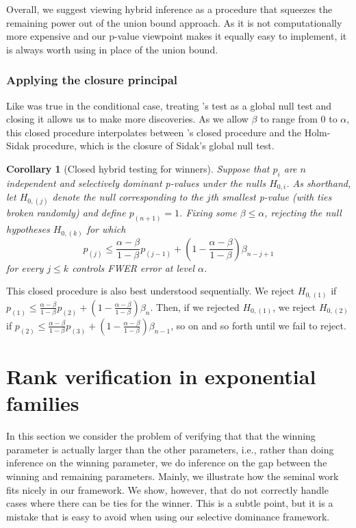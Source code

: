 \documentclass{article}
\newtheorem{corollary}{Corollary}
\begin{document}
Overall, we suggest viewing hybrid inference as a procedure that squeezes the remaining power out of the union bound approach. As it is not computationally more expensive and our p-value viewpoint makes it equally easy to implement, it is always worth using in place of the union bound. 

\subsubsection{Applying the closure principal}

Like was true in the conditional case, treating 's test as a global null test and closing it allows us to make more discoveries. As we allow $\beta$ to range from $0$ to $\alpha$, this closed procedure interpolates between 's closed procedure and the Holm-Sidak procedure, which is the closure of Sidak's global null test. 

\begin{corollary}[Closed hybrid testing for winners]
    \label{cor:hyb_closed}
    Suppose that $p_i$ are $n$ independent and selectively dominant p-values under the nulls $H_{0, i}$. As shorthand, let $H_{0, (j)}$ denote the null corresponding to the $j$th smallest p-value (with ties broken randomly) and define $p_{(n+1)} = 1$. Fixing some $\beta \leq \alpha$, rejecting the null hypotheses $H_{0, (k)}$ for which
    \begin{equation*}
        p_{(j)} \leq \frac{\alpha - \beta}{1-\beta} p_{(j-1)} + \left(1 - \frac{\alpha - \beta}{1-\beta} \right) \beta_{n - j + 1}   
    \end{equation*}
    for every $j \leq k$ controls FWER error at level $\alpha$. 
\end{corollary}

This closed procedure is also best understood sequentially. We reject $H_{0, (1)}$ if $p_{(1)} \leq \frac{\alpha - \beta}{1-\beta} p_{(2)} + (1 - \frac{\alpha - \beta}{1-\beta}) \beta_n$. Then, if we rejected $H_{0, (1)}$, we reject $H_{0, (2)}$ if $p_{(2)} \leq  \frac{\alpha - \beta}{1-\beta} p_{(3)} + (1 - \frac{\alpha -\beta }{1-\beta}) \beta_{n-1}$, so on and so forth until we fail to reject. 


\section{Rank verification in exponential families}
\label{sec:rank_verification}

In this section we consider the problem of verifying that that the winning parameter is actually larger than the other parameters, i.e., rather than doing inference on the winning parameter, we do inference on the gap between the winning and remaining parameters. Mainly, we illustrate how the seminal work \cite{Hung2019} fits nicely in our framework. We show, however, that \cite{Hung2019} do not correctly handle cases where there can be ties for the winner. This is a subtle point, but it is a mistake that is easy to avoid when using our selective dominance framework. 
\end{document}
